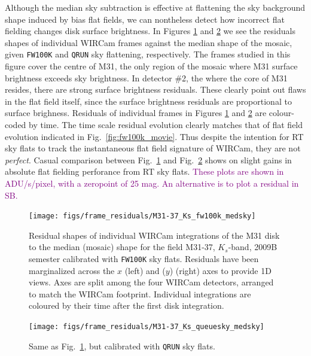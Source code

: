 \documentclass[iop]{emulateapj}
\newcommand{\comment}[1]{\textcolor{purple}{#1}} %
\newcommand{\Fig}[1]{Fig.~\ref{fig:#1}}  %
\begin{document}
Although the median sky subtraction is effective at flattening the sky background shape induced by bias flat fields, we can nontheless detect how incorrect flat fielding changes disk surface brightness.
In Figures \ref{fig:frame_residuals_M31-37_Ks_fw100k_medsky} and \ref{fig:frame_residuals_M31-37_Ks_QRUN} we see the residuals shapes of individual WIRCam frames against the median shape of the mosaic, given \texttt{FW100K} and \texttt{QRUN} sky flattening, respectively.
The frames studied in this figure cover the centre of M31, the only region of the mosaic where M31 surface brightness exceeds sky brightness.
In detector \#2, the where the core of M31 resides, there are strong surface brightness residuals.
These clearly point out flaws in the flat field itself, since the surface brightness residuals are proportional to surface brighness.
Residuals of individual frames in Figures \ref{fig:frame_residuals_M31-37_Ks_fw100k_medsky} and \ref{fig:frame_residuals_M31-37_Ks_QRUN} are colour-coded by time.
The time scale residual evolution clearly matches that of flat field evolution indicated in \Fig{fw100k_movie}.
Thus despite the intention for RT sky flats to track the instantaneous flat field signature of WIRCam, they are not \emph{perfect}.
Casual comparison between \Fig{frame_residuals_M31-37_Ks_fw100k_medsky} and \Fig{frame_residuals_M31-37_Ks_QRUN} shows on slight gains in absolute flat fielding perforance from RT sky flats.
\comment{These plots are shown in ADU/s/pixel, with a zeropoint of 25 mag. An alternative is to plot a residual in SB.}


\begin{figure}[t]
\centering
\texttt{[image: figs/frame\_residuals/M31-37\_Ks\_fw100k\_medsky]}
\caption{Residual shapes of individual WIRCam integrations of the M31 disk to the median (mosaic) shape for the field M31-37, $K_s$-band, 2009B semester calibrated with \texttt{FW100K} sky flats.
Residuals have been marginalized across the $x$ (left) and ($y$) (right) axes to provide 1D views.
Axes are split among the four WIRCam detectors, arranged to match the WIRCam footprint.
Individual integrations are coloured by their time after the first disk integration.}
\label{fig:frame_residuals_M31-37_Ks_fw100k_medsky}
\end{figure}

\begin{figure}[t]
\centering
\texttt{[image: figs/frame\_residuals/M31-37\_Ks\_queuesky\_medsky]}
\caption{Same as \Fig{frame_residuals_M31-37_Ks_fw100k_medsky}, but calibrated with \texttt{QRUN} sky flats.}
\label{fig:frame_residuals_M31-37_Ks_QRUN}
\end{figure}
\end{document}
